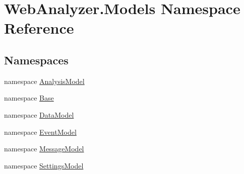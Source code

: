 \hypertarget{namespace_web_analyzer_1_1_models}{}\section{Web\+Analyzer.\+Models Namespace Reference}
\label{namespace_web_analyzer_1_1_models}
\subsection*{Namespaces}
\begin{DoxyCompactItemize}
\item 
namespace \hyperlink{namespace_web_analyzer_1_1_models_1_1_analysis_model}{Analysis\+Model}
\item 
namespace \hyperlink{namespace_web_analyzer_1_1_models_1_1_base}{Base}
\item 
namespace \hyperlink{namespace_web_analyzer_1_1_models_1_1_data_model}{Data\+Model}
\item 
namespace \hyperlink{namespace_web_analyzer_1_1_models_1_1_event_model}{Event\+Model}
\item 
namespace \hyperlink{namespace_web_analyzer_1_1_models_1_1_message_model}{Message\+Model}
\item 
namespace \hyperlink{namespace_web_analyzer_1_1_models_1_1_settings_model}{Settings\+Model}
\end{DoxyCompactItemize}
